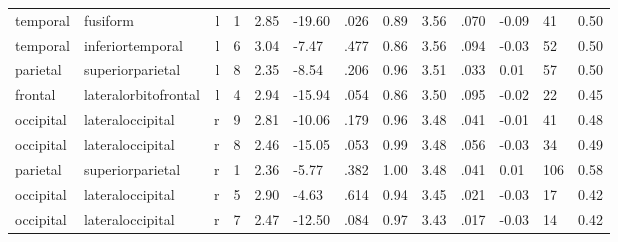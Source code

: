 \documentclass{article}
\begin{document}
\begin{longtable}{llrR{1.3cm}R{1cm}R{1.3cm}R{1cm}R{1cm}R{1.3cm}R{1cm}R{1.8cm}R{1.3cm}R{1.8cm}}
  temporal &                  fusiform &    l &         1 &                  2.85 &           -19.60 &               .026 &                               0.89 &                          3.56 &                            .070 &  -0.09 &     41 &      0.50 \\
  temporal &          inferiortemporal &    l &         6 &                  3.04 &            -7.47 &               .477 &                               0.86 &                          3.56 &                            .094 &  -0.03 &     52 &      0.50 \\
  parietal &          superiorparietal &    l &         8 &                  2.35 &            -8.54 &               .206 &                               0.96 &                          3.51 &                            .033 &   0.01 &     57 &      0.50 \\
   frontal &      lateralorbitofrontal &    l &         4 &                  2.94 &           -15.94 &               .054 &                               0.86 &                          3.50 &                            .095 &  -0.02 &     22 &      0.45 \\
 occipital &          lateraloccipital &    r &         9 &                  2.81 &           -10.06 &               .179 &                               0.96 &                          3.48 &                            .041 &  -0.01 &     41 &      0.48 \\
 occipital &          lateraloccipital &    r &         8 &                  2.46 &           -15.05 &               .053 &                               0.99 &                          3.48 &                            .056 &  -0.03 &     34 &      0.49 \\
  parietal &          superiorparietal &    r &         1 &                  2.36 &            -5.77 &               .382 &                               1.00 &                          3.48 &                            .041 &   0.01 &    106 &      0.58 \\
 occipital &          lateraloccipital &    r &         5 &                  2.90 &            -4.63 &               .614 &                               0.94 &                          3.45 &                            .021 &  -0.03 &     17 &      0.42 \\
 occipital &          lateraloccipital &    r &         7 &                  2.47 &           -12.50 &               .084 &                               0.97 &                          3.43 &                            .017 &  -0.03 &     14 &      0.42 \\

\end{longtable}
\end{document}
